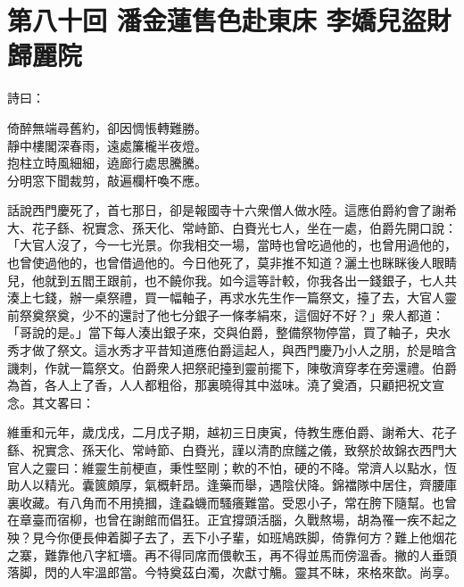
\chapter*{第八十回 潘金蓮售色赴東床 李嬌兒盜財歸麗院}


詩曰：

\begin{myquote} 
倚醉無端尋舊約，卻因惆悵轉難勝。\\靜中樓閣深春雨，遠處簾櫳半夜燈。\\抱柱立時風細細，遶廊行處思騰騰。\\分明窓下聞裁剪，敲遍欄杆喚不應。
\end{myquote} 

話說西門慶死了，首七那日，卻是報國寺十六衆僧人做水陸。這應伯爵約會了謝希大、花子繇、祝實念、孫天化、常峙節、白賚光七人，坐在一處，伯爵先開口說：「大官人沒了，今一七光景。你我相交一場，當時也曾吃過他的，也曾用過他的，也曾使過他的，也曾借過他的。今日他死了，莫非推不知道？{}灑土也眯眯後人眼睛兒，他就到五閻王跟前，也不饒你我。{}如今這等計較，你我各出一錢銀子，七人共湊上七錢，辦一桌祭禮，買一幅軸子，再求水先生作一篇祭文，擡了去，大官人靈前祭奠祭奠，少不的還討了他七分銀子一條孝絹來，這個好不好？」衆人都道：「哥說的是。」當下每人湊出銀子來，交與伯爵，整備祭物停當，買了軸子，央水秀才做了祭文。這水秀才平昔知道應伯爵這起人，與西門慶乃小人之朋，於是暗含譏刺，作就一篇祭文。伯爵衆人把祭祀擡到靈前擺下，陳敬濟穿孝在旁還禮。伯爵為首，各人上了香，人人都粗俗，那裏曉得其中滋味。澆了奠酒，只顧把祝文宣念。其文畧曰：

\begin{myquote}[\markfont]
維重和元年，歲戊戌，二月戊子期，越初三日庚寅，侍教生應伯爵、謝希大、花子繇、祝實念、孫天化、常峙節、白賚光，謹以清酌庶饈之儀，致祭於故錦衣西門大官人之靈曰：維靈生前梗直，秉性堅剛；軟的不怕，硬的不降。常濟人以點水，恆助人以精光。囊篋頗厚，氣概軒昂。逢藥而舉，遇陰伏降。錦襠隊中居住，齊腰庫裏收藏。有八角而不用撓摑，逢蝨蟣而騷癢難當。受恩小子，常在胯下隨幫。也曾在章臺而宿柳，也曾在謝館而倡狂。正宜撐頭活腦，久戰熬場，胡為罹一疾不起之殃？見今你便長伸着脚子去了，丟下小子輩，如班鳩跌脚，倚靠何方？難上他烟花之寨，難靠他八字紅墻。再不得同席而偎軟玉，再不得並馬而傍溫香。撇的人垂頭落脚，閃的人牢溫郎當。今特奠茲白濁，次獻寸觴。靈其不昧，來格來歆。尚享。{}
\end{myquote} 


